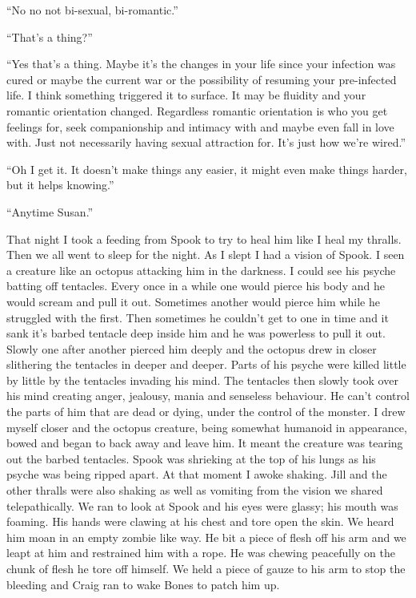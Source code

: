 ``No no not bi-sexual, bi-romantic.''

``That's a thing?''

``Yes that's a thing. Maybe it's the changes in your life since your infection was cured or maybe the current war or the possibility of resuming your pre-infected life. I think something triggered it to surface. It may be fluidity and your romantic orientation changed. Regardless romantic orientation is who you get feelings for, seek companionship and intimacy with and maybe even fall in love with. Just not necessarily having sexual attraction for. It's just how we're wired.''

``Oh I get it. It doesn't make things any easier, it might even make things harder, but it helps knowing.''

``Anytime Susan.''

That night I took a feeding from Spook to try to heal him like I heal my thralls. Then we all went to sleep for the night. As I slept I had a vision of Spook. I seen a creature like an octopus attacking him in the darkness. I could see his psyche batting off tentacles. Every once in a while one would pierce his body and he would scream and pull it out. Sometimes another would pierce him while he struggled with the first. Then sometimes he couldn't get to one in time and it sank it's barbed tentacle deep inside him and he was powerless to pull it out. Slowly one after another pierced him deeply and the octopus drew in closer slithering the tentacles in deeper and deeper. Parts of his psyche were killed little by little by the tentacles invading his mind. The tentacles then slowly took over his mind creating anger, jealousy, mania and senseless behaviour. He can't control the parts of him that are dead or dying, under the control of the monster. I drew myself closer and the octopus creature, being somewhat humanoid in appearance, bowed and began to back away and leave him. It meant the creature was tearing out the barbed tentacles. Spook was shrieking at the top of his lungs as his psyche was being ripped apart. At that moment I awoke shaking. Jill and the other thralls were also shaking as well as vomiting from the vision we shared telepathically. We ran to look at Spook and his eyes were glassy; his mouth was foaming. His hands were clawing at his chest and tore open the skin. We heard him moan in an empty zombie like way. He bit a piece of flesh off his arm and we leapt at him and restrained him with a rope. He was chewing peacefully on the chunk of flesh he tore off himself. We held a piece of gauze to his arm to stop the bleeding and Craig ran to wake Bones to patch him up.

